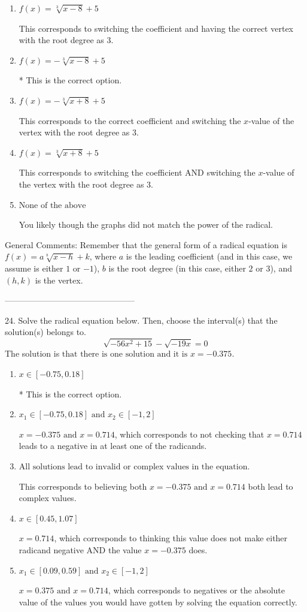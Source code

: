 \documentclass{extbook}[14pt]
\begin{document}
\begin{enumerate}[label=\Alph*.] 
\item $ f(x) = \sqrt[3]{x - 8} + 5 $ 

 This corresponds to switching the coefficient and having the correct vertex with the root degree as $3$. 
\item $ f(x) = - \sqrt[3]{x - 8} + 5 $ 

 * This is the correct option. 
\item $ f(x) = - \sqrt[3]{x + 8} + 5 $ 

 This corresponds to the correct coefficient and switching the $x$-value of the vertex with the root degree as $3$. 
\item $ f(x) = \sqrt[3]{x + 8} + 5 $ 

 This corresponds to switching the coefficient AND switching the $x$-value of the vertex with the root degree as $3$. 
\item $ \text{None of the above} $ 

 You likely though the graphs did not match the power of the radical. 
\end{enumerate} 
 
General Comments: Remember that the general form of a radical equation is $ f(x) = a \sqrt[b]{x - h} + k$, where $a$ is the leading coefficient (and in this case, we assume is either $1$ or $-1$), $b$ is the root degree (in this case, either $2$ or $3$), and $(h, k)$ is the vertex.

-----------------------------------------------

24. Solve the radical equation below. Then, choose the interval(s) that the solution(s) belongs to.
\[ \sqrt{-56 x^2 + 15} - \sqrt{-19 x} = 0 \] 
The solution is $ \text{that there is one solution and it is } x = -0.375. $ 

\begin{enumerate}[label=\Alph*.] 
\item $ x \in [-0.75,0.18] $ 

 * This is the correct option. 
\item $ x_1 \in [-0.75, 0.18] \text{ and } x_2 \in [-1,2] $ 

 $x = -0.375 \text{ and } x = 0.714$, which corresponds to not checking that $x = 0.714$ leads to a negative in at least one of the radicands. 
\item $ \text{All solutions lead to invalid or complex values in the equation.} $ 

 This corresponds to believing both $x = -0.375 \text{ and } x = 0.714$ both lead to complex values. 
\item $ x \in [0.45,1.07] $ 

 $x = 0.714$, which corresponds to thinking this value does not make either radicand negative AND the value $x = -0.375$ does. 
\item $ x_1 \in [0.09, 0.59] \text{ and } x_2 \in [-1,2] $ 

 $x = 0.375 \text{ and } x = 0.714$, which corresponds to negatives or the absolute value of the values you would have gotten by solving the equation correctly. 
\end{enumerate} 
 
\end{document}
